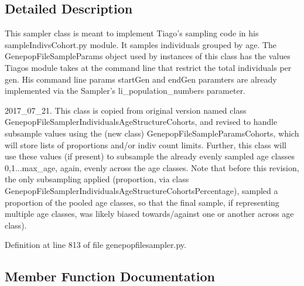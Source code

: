\subsection{Detailed Description}
\begin{DoxyVerb}This sampler class is meant to implement Tiago's sampling code in his
sampleIndivsCohort.py module.  It samples  individuals grouped by age.
The GenepopFileSampleParams object used by instances
of this class has the values Tiagos module takes at the command line 
that restrict the total individuals per gen.  His command line params 
startGen and endGen paramters are already implemented via the Sampler's
li_population_numbers parameter.


2017_07_21.  This class is copied from original version named class
GenepopFileSamplerIndividualsAgeStructureCohorts, and revised to 
handle subsample values using the (new class) GenepopFileSampleParamsCohorts,
which will store lists of proportions and/or indiv count limits.  Further,
this class will use these values (if present) to subsample the already
evenly sampled age classes 0,1...max_age, again, evenly across the age classes.
Note that before this revision, the only subsampling applied (proportion,
via class GenepopFileSamplerIndividualsAgeStructureCohortsPercentage),
sampled a proportion of the pooled age classes, so that the final sample,
if representing multiple age classes, was likely biased towards/against 
one or another across age class).
\end{DoxyVerb}
 

Definition at line 813 of file genepopfilesampler.\+py.



\subsection{Member Function Documentation}
